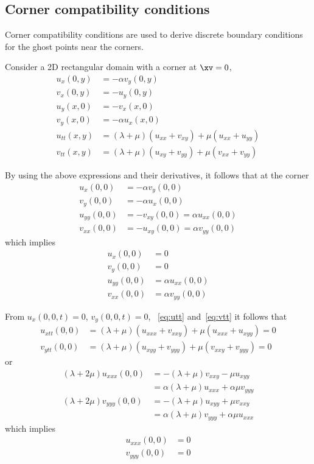 \clearpage
\subsection{Corner compatibility conditions}

Corner compatibility conditions are used to derive discrete boundary conditions for the
ghost points near the corners.

Consider a 2D rectangular domain with a corner at $\xv=0$,
\begin{align}
   u_x(0,y) &= - \alpha v_y(0,y) \\
   v_x(0,y) &= - u_y(0,y) \\
   u_y(x,0) &= -v_x(x,0) \\
   v_y(x,0) &= - \alpha u_x(x,0)  \\
   u_{tt}(x,y) &= (\lambda+\mu)(u_{xx} + v_{xy}) + \mu(u_{xx} + u_{yy}) \label{eq:utt} \\
   v_{tt}(x,y) &= (\lambda+\mu)(u_{xy} + v_{yy}) + \mu(v_{xx} + v_{yy}) \label{eq:vtt} 
\end{align}

By using the above expressions and their derivatives, it follows that at the corner
\begin{align}
   u_x(0,0) &= - \alpha v_y(0,0) \\
   v_y(0,0) &= - \alpha u_x(0,0) \\
   u_{yy}(0,0) &= - v_{xy}(0,0) = \alpha u_{xx}(0,0) \\
   v_{xx}(0,0)&=-u_{xy}(0,0) = \alpha v_{yy}(0,0) 
\end{align}
which implies 
\begin{align}
   u_x(0,0) &=0 \\
   v_y(0,0) &=0 \\
   u_{yy}(0,0) &= \alpha u_{xx}(0,0) \\
   v_{xx}(0,0) &= \alpha v_{yy}(0,0) 
\end{align}

From $u_x(0,0,t)=0$, $v_y(0,0,t)=0$, ~\eqref{eq:utt} and~\eqref{eq:vtt} it follows that
\begin{align}
   u_{xtt}(0,0) &= (\lambda+\mu)(u_{xxx} + v_{xxy}) + \mu(u_{xxx} + u_{xyy}) =0 \\
   v_{ytt}(0,0) &= (\lambda+\mu)(u_{xyy} + v_{yyy}) + \mu(v_{xxy} + v_{yyy}) =0
\end{align}
or
\begin{align}
   (\lambda+2\mu)u_{xxx}(0,0) &= -(\lambda+\mu)v_{xxy} - \mu u_{xyy} \\
                         &= \alpha(\lambda+\mu)u_{xxx} +\alpha\mu v_{yyy} \\
   (\lambda+2\mu)v_{yyy}(0,0) &= -(\lambda+\mu)u_{xyy}+\mu v_{xxy} \\
                         &= \alpha(\lambda+\mu)v_{yyy} + \alpha \mu u_{xxx}
\end{align}
which implies
\begin{align}
   u_{xxx}(0,0) &=0 \\
   v_{yyy}(0,0) &=0 
\end{align}

